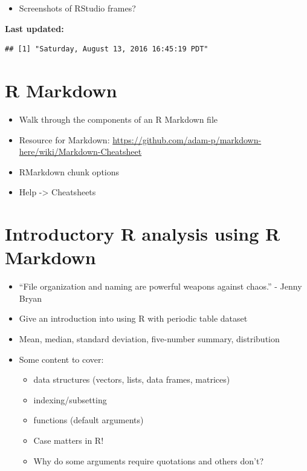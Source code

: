 \documentclass[]{tufte-book}
\providecommand{\tightlist}{%
  \setlength{\itemsep}{0pt}\setlength{\parskip}{0pt}}
\begin{document}
\begin{itemize}
\tightlist
\item
  Screenshots of RStudio frames?
\end{itemize}

\textbf{Last updated:}

\begin{verbatim}
## [1] "Saturday, August 13, 2016 16:45:19 PDT"
\end{verbatim}

\chapter{R Markdown}\label{rmarkdown}

\begin{itemize}
\tightlist
\item
  Walk through the components of an R Markdown file
\item
  Resource for Markdown:
  \url{https://github.com/adam-p/markdown-here/wiki/Markdown-Cheatsheet}
\item
  RMarkdown chunk options
\item
  Help -\textgreater{} Cheatsheets
\end{itemize}

\chapter{Introductory R analysis using R Markdown}\label{rmdanal}

\begin{itemize}
\tightlist
\item
  ``File organization and naming are powerful weapons against chaos.'' -
  Jenny Bryan
\item
  Give an introduction into using R with periodic table dataset
\item
  Mean, median, standard deviation, five-number summary, distribution
\item
  Some content to cover:

  \begin{itemize}
  \tightlist
  \item
    data structures (vectors, lists, data frames, matrices)
  \item
    indexing/subsetting
  \item
    functions (default arguments)
  \item
    Case matters in R!
  \item
    Why do some arguments require quotations and others don't?
  \end{itemize}
\end{itemize}


\end{document}
